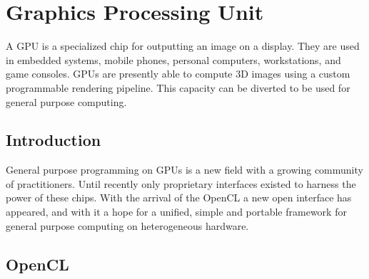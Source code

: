 %

\glsresetall
\chapter{Graphics Processing Unit}

A \gls{GPU} is a specialized chip for outputting an image on a display. They are used in embedded systems, mobile phones, personal computers, workstations, and game consoles. \Glspl{GPU} are presently able to compute 3D images using a custom programmable rendering pipeline. This capacity can be diverted to be used for general purpose computing.

\section{Introduction}

General purpose programming on \glspl{GPU} is a new field with a growing community of practitioners. Until recently only proprietary interfaces existed to harness the power of these chips. With the arrival of the \gls{OpenCL} a new open interface has appeared, and with it a hope for a unified, simple and portable framework for general purpose computing on heterogeneous hardware.

\section{OpenCL}

